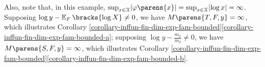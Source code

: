 \begin{example}[name=Lognormal location model]
	Also, note that, in this example, $\sup_{x \in \calX} \abs{\varphi \parens{x}} = \sup_{x \in \calX} \abs{\log x} = \infty$. Supposing $\log y - \E_F \bracks{\log X} \neq 0$, we have $M \parens{T, F, y} = \infty$, which illustrates Corollary \ref{corollary-inffun-fin-dim-exp-fam-bounded}\ref{corollary-inffun-fin-dim-exp-fam-bounded-a}; supposing $\log y - \frac{m_2}{m_3} \neq 0$, we have $M \parens{S, F, y} = \infty$, which illustrates Corollary \ref{corollary-inffun-fin-dim-exp-fam-bounded}\ref{corollary-inffun-fin-dim-exp-fam-bounded-b}. 
\end{example}


